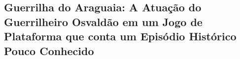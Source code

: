 
\begin{apendicesenv}
\partapendices

\chapter{Guerrilha do Araguaia: A Atuação do Guerrilheiro Osvaldão em um Jogo de  Plataforma que conta  um Episódio Histórico Pouco Conhecido}

\label{chap:apendiceA}



\end{apendicesenv}
